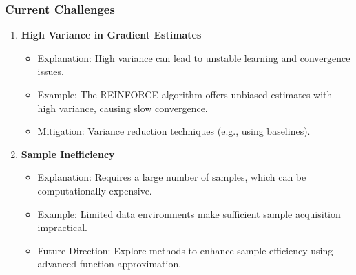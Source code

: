 \documentclass[aspectratio=169]{beamer}
\begin{document}
\begin{frame}[fragile]
    \frametitle{Current Challenges}
    \begin{enumerate}
        \item \textbf{High Variance in Gradient Estimates}
            \begin{itemize}
                \item Explanation: High variance can lead to unstable learning and convergence issues.
                \item Example: The REINFORCE algorithm offers unbiased estimates with high variance, causing slow convergence.
                \item Mitigation: Variance reduction techniques (e.g., using baselines).
            \end{itemize}
        \item \textbf{Sample Inefficiency}
            \begin{itemize}
                \item Explanation: Requires a large number of samples, which can be computationally expensive.
                \item Example: Limited data environments make sufficient sample acquisition impractical.
                \item Future Direction: Explore methods to enhance sample efficiency using advanced function approximation.
            \end{itemize}
    \end{enumerate}
\end{frame}
\end{document}
